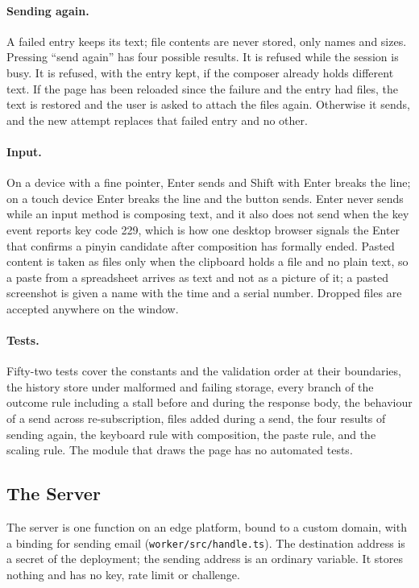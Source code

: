 \documentclass[sigconf,nonacm]{acmart}
\newcommand{\code}[1]{\textnormal{\texttt{\small #1}}}
\begin{document}
\paragraph{Sending again.}
A failed entry keeps its text; file contents are never stored, only names and sizes. Pressing
``send again'' has four possible results. It is refused while the session is busy. It is
refused, with the entry kept, if the composer already holds different text. If the page has
been reloaded since the failure and the entry had files, the text is restored and the user is
asked to attach the files again. Otherwise it sends, and the new attempt replaces that failed
entry and no other.

\paragraph{Input.}
On a device with a fine pointer, Enter sends and Shift with Enter breaks the line; on a touch
device Enter breaks the line and the button sends. Enter never sends while an input method is
composing text, and it also does not send when the key event reports key code 229, which is
how one desktop browser signals the Enter that confirms a pinyin candidate after composition
has formally ended. Pasted content is taken as files only when the clipboard holds a file and
no plain text, so a paste from a spreadsheet arrives as text and not as a picture of it; a
pasted screenshot is given a name with the time and a serial number. Dropped files are
accepted anywhere on the window.

\paragraph{Tests.}
Fifty-two tests cover the constants and the validation order at their boundaries, the history
store under malformed and failing storage, every branch of the outcome rule including a stall
before and during the response body, the behaviour of a send across re-subscription, files
added during a send, the four results of sending again, the keyboard rule with composition,
the paste rule, and the scaling rule. The module that draws the page has no automated tests.

\subsection{The Server}\label{sec:worker}
The server is one function on an edge platform, bound to a custom domain, with a binding for
sending email (\code{worker/src/handle.ts}). The destination address is a secret of the
deployment; the sending address is an ordinary variable. It stores nothing and has no key,
rate limit or challenge.
\end{document}
